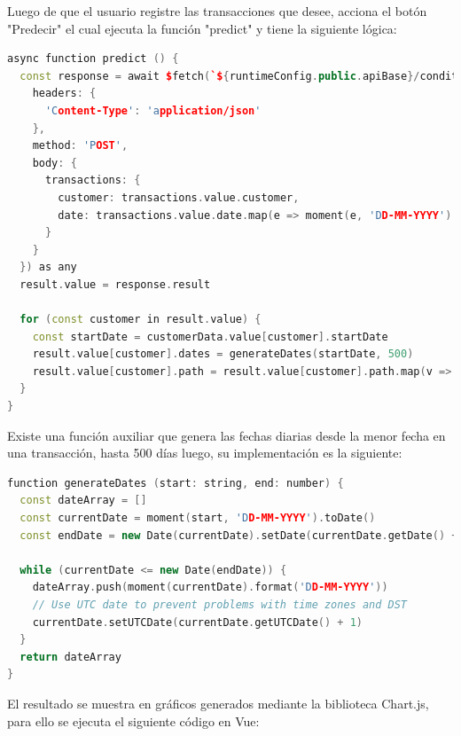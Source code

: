 Luego de que el usuario registre las transacciones que desee, acciona el botón "Predecir" el cual ejecuta la función "predict" y tiene la siguiente lógica:

\begin{lstlisting}[language=C++, caption=predict en index.vue]
async function predict () {
  const response = await $fetch(`${runtimeConfig.public.apiBase}/conditional-probability-alive`, {
    headers: {
      'Content-Type': 'application/json'
    },
    method: 'POST',
    body: {
      transactions: {
        customer: transactions.value.customer,
        date: transactions.value.date.map(e => moment(e, 'DD-MM-YYYY').format('MM/DD/YYYY'))
      }
    }
  }) as any
  result.value = response.result

  for (const customer in result.value) {
    const startDate = customerData.value[customer].startDate
    result.value[customer].dates = generateDates(startDate, 500)
    result.value[customer].path = result.value[customer].path.map(v => Math.floor((1 - v) * 1000) / 10)
  }
}
\end{lstlisting}	

Existe una función auxiliar que genera las fechas diarias desde la menor fecha en una transacción, hasta 500 días luego, su implementación es la siguiente:

\begin{lstlisting}[language=C++, caption=generateDates en index.vue]
function generateDates (start: string, end: number) {
  const dateArray = []
  const currentDate = moment(start, 'DD-MM-YYYY').toDate()
  const endDate = new Date(currentDate).setDate(currentDate.getDate() + end)

  while (currentDate <= new Date(endDate)) {
    dateArray.push(moment(currentDate).format('DD-MM-YYYY'))
    // Use UTC date to prevent problems with time zones and DST
    currentDate.setUTCDate(currentDate.getUTCDate() + 1)
  }
  return dateArray
}
\end{lstlisting}	

El resultado se muestra en gráficos generados mediante la biblioteca Chart.js, para ello se ejecuta el siguiente código en Vue:

